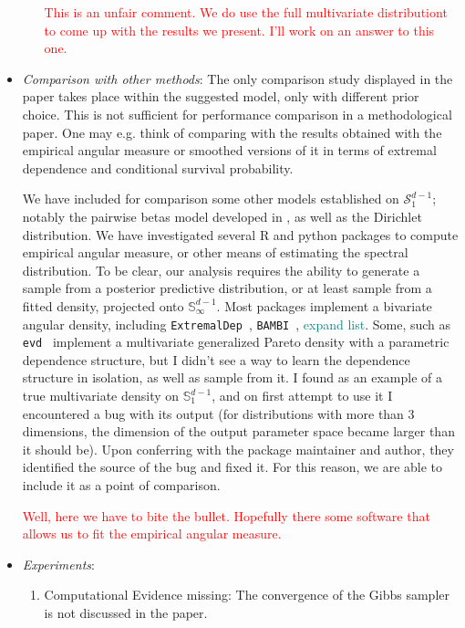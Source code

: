 \documentclass[10pt]{article}
\newcommand{\comment}[1]{\textcolor{teal}{#1}}
\newcommand{\bruno}[1]{\textcolor{red}{#1}}
\begin{document}
\begin{itemize}
\begin{enumerate}
        \bruno{This is an unfair comment. We do use the full multivariate distributiont to come up
        with the results we present. I'll work on an answer to this one.}
    \end{enumerate}

\item \emph{Comparison with other methods}: The only comparison study displayed in the paper 
    takes place within the suggested model, only with different prior choice. This is not sufficient 
    for performance comparison in a methodological paper. One may e.g. think of comparing with the
    results obtained with the empirical angular measure or smoothed versions of it in terms of 
    extremal dependence and conditional survival probability.

    We have included for comparison some other models established on $\mathcal{S}_{1}^{d-1}$;
        notably the pairwise betas model developed in \cite{sabourin2013}, as well
        as the Dirichlet distribution.  We have investigated several R and python packages to
        compute empirical angular measure, or other means of estimating the spectral distribution.
        To be clear, our analysis requires the ability to generate a sample from a posterior
        predictive distribution, or at least sample from a fitted density, projected onto 
        $\mathbb{S}_{\infty}^{d-1}$. Most packages implement a bivariate angular density, 
        including \verb|ExtremalDep|~\citep{ExtremalDep}, \verb|BAMBI|~\citep{BAMBI}, 
        \comment{expand list}.  Some, such as
        \verb|evd|~\citep{evd} implement a multivariate generalized Pareto density with a 
        parametric dependence structure, but I didn't see a way to learn the dependence
        structure in isolation, as well as sample from it.  I found 
        \cite{BMAmevt} as an example of a true multivariate density on $\mathbb{S}_1^{d-1}$, 
        and on first attempt to use
        it I encountered a bug with its output (for distributions with more than 3 dimensions, 
        the dimension of the output parameter space became larger than it should be).  Upon 
        conferring with the package maintainer and author, they identified the source of the
        bug and fixed it.  For this reason, we are able to include it as a point of comparison.
    
    \bruno{Well, here we have to bite the bullet. Hopefully there some software that allows us
    to fit the empirical angular measure.}

    \item \emph{Experiments}:
        \begin{enumerate}
            \item Computational Evidence missing: The convergence of the Gibbs sampler is not 
            discussed in the paper.


\end{enumerate}
\end{itemize}
\end{document}
